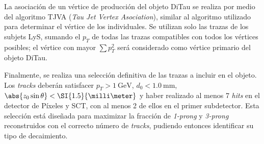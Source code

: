 La asociación de un vértice de producción del objeto DiTau se realiza por medio del algoritmo TJVA (\textit{Tau Jet Vertex Asociation}), similar al algoritmo utilizado para determinar el vértice de los \thad individuales. Se utilizan solo las trazas de los subjets LyS, sumando el $p_T$ de todas las trazas compatibles con todos los vértices posibles; el vértice con mayor $\sum p_T^2$ será considerado como vértice primario del objeto DiTau.

Finalmente, se realiza una selección definitiva de las trazas a incluir en el objeto. Los \textit{tracks} deberán satisfacer $p_T > \SI{1}{\GeV}$, $d_0 < \SI{1.0}{\milli\meter}$, $\abs{z_0 \sin\theta} < \SI{1.5}{\milli\meter}$ y haber realizado al menos 7 \textit{hits} en el detector de Píxeles y SCT, con al menos 2 de ellos en el primer subdetector. Esta selección está diseñada para maximizar la fracción de \thads \textit{1-prong} y \textit{3-prong} reconstruidos con el correcto número de \textit{tracks}, pudiendo entonces identificar su tipo de decaimiento.

